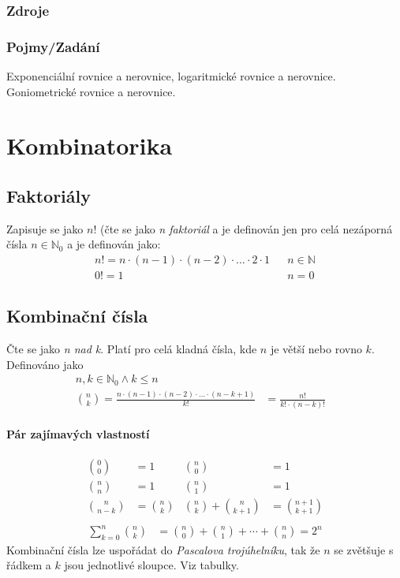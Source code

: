 \documentclass[12pt]{article}
\begin{document}
\subsubsection{Zdroje}
\subsubsection{Pojmy/Zadání}
Exponenciální rovnice a nerovnice, logaritmické rovnice a nerovnice. Goniometrické rovnice a nerovnice.
\section{Kombinatorika}
\subsection{Faktoriály}
Zapisuje se jako $n!$ (čte se jako \emph{n faktoriál} a je definován jen pro celá nezáporná čísla $n \in \mathbb{N}_0$ a je definován jako:
\begin{align}
n! = n \cdot (n-1) \cdot (n-2) \cdot \dots \cdot 2 \cdot 1 && n \in \mathbb{N}\\
0! = 1 && n=0
\end{align}
\subsection{Kombinační čísla}
Čte se jako \emph{n nad k}. Platí pro celá kladná čísla, kde $n$ je větší nebo rovno $k$. Definováno jako
\begin{align}
n,k \in \mathbb{N}_0 \land k \leq n && \\
\binom{n}{k} = \frac{n \cdot (n-1) \cdot (n-2) \cdot \dotso  \cdot (n-k+1)}{k!} &= \frac{n!}{k! \cdot (n-k)!}
\end{align}
\paragraph{Pár zajímavých vlastností}
\begin{align*}
\binom{0}{0} &= 1 & \binom{n}{0} &=1\\
\binom{n}{n} &= 1 & \binom{n}{1} &=1\\
\binom{n}{n-k} &= \binom{n}{k} & \binom{n}{k} + \binom{n}{k+1} &= \binom{n+1}{k+1}\\
\end{align*}
\begin{align*}
\sum^n_{k=0} \binom{n}{k} &= \binom{n}{0} + \binom{n}{1} + \cdots + \binom{n}{n} = 2^n
\end{align*}
Kombinační čísla lze uspořádat do \emph{Pascalova trojúhelníku}, tak že $n$ se zvětšuje s řádkem a $k$ jsou jednotlivé sloupce. Viz tabulky.
\end{document}
